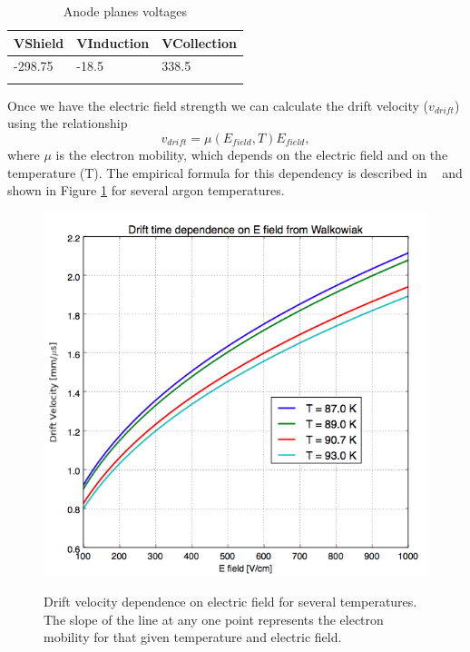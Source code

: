 \begin{table}[htpb]
\centering
\caption{Anode planes voltages}
\label{tab:voltages}
\begin{tabular}{lll}
\hline
\multicolumn{1}{|l|}{VShield} & \multicolumn{1}{l|}{VInduction} & \multicolumn{1}{l|}{VCollection} \\ \hline
\multicolumn{1}{|l|}{-298.75} & \multicolumn{1}{l|}{-18.5}      & \multicolumn{1}{l|}{338.5}       \\ \hline
                              &                                 &                                 
\end{tabular}
\end{table}

Once we have the electric field strength we can calculate the drift velocity ($v_{drift}$) using the relationship
\begin{equation} v_{drift} = \mu(E_{field},T) E_{field}, \label{eq:vd}
\end{equation}
where $\mu$ is the electron mobility, which depends on the electric field and on the temperature (T). The empirical formula for this dependency is described in ~\cite{WWW} and shown in Figure \ref{fig:EV} for several argon temperatures.

\begin{figure}[htb]
\centering
\includegraphics[scale=0.45]{./images/Walkowiak.png}\\
\caption{Drift velocity dependence on electric field for several temperatures. The slope of the line at any one point represents the electron mobility for that given temperature and electric field.}
\label{fig:EV}
\end{figure}

